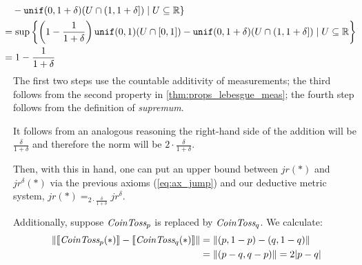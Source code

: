 \begin{example}
\begin{align*}
        & \hspace{-15pt} \hspace{10pt}
        - \mathtt{unif}(0,1 + \delta)(U \cap (1,1 + \delta]) 
        \mid U \subseteq \Reals \}
        \\
        &
        \hspace{-15pt}= \sup \left \{ \left (1 - \frac{1}{1+\delta} \right ) 
                \mathtt{unif}(0,1)(U \cap [0,1]) 
        - \mathtt{unif}(0,1 + \delta)(U \cap (1,1 + \delta]) 
        \mid U \subseteq \Reals \right \}
        \\
        & \hspace{-15pt} = 1 - \frac{1}{1+\delta} 
        \end{align*}
        The first two steps use the countable additivity of measurements; the third follows from the second property in \autoref{thm:props_lebesgue_meas}; the fourth step follows from the definition of \emph{supremum}.

        It follows from an analogous reasoning the right-hand side of the
        addition will be $\frac{\delta}{1 + \delta}$ and therefore the norm
        will be $2 \cdot {\frac{\delta}{1 + \delta}}$.

Then, with this in hand, one can put an upper bound between $jr(\ast)$ and $jr^{\delta}(\ast)$ via the previous axioms (\autoref{eq:ax_jump}) and our deductive metric system, $ jr(\ast) =_{2 \cdot {\frac{\delta}{1 + \delta}}} jr^{\delta}$.

Additionally, suppose  $\emph{CoinToss}_p$ is replaced by $\emph{CoinToss}_q$. We calculate:
\begin{align*}
    \left\lVert \left \llbracket \emph{CoinToss}_p(*) \right \rrbracket - \left \llbracket \emph{CoinToss}_q(*) \right \rrbracket \right\rVert & = \left\lVert (p,1-p) - (q, 1-q) \right\rVert \\
    & =\left\lVert (p-q,q-p) \right\rVert  = 2|p-q|
  \end{align*}



\end{example}
